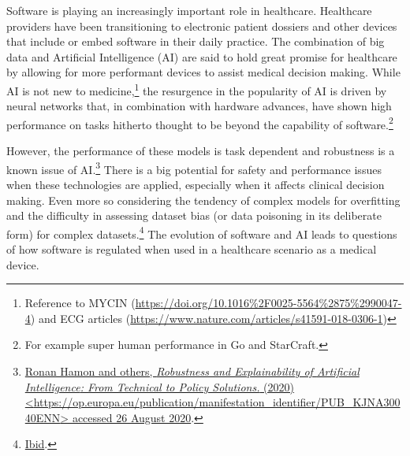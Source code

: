 \documentclass[
]{scrartcl}
\begin{document}
Software is playing an increasingly important role in healthcare. Healthcare providers have been transitioning to electronic patient dossiers and other devices that include or embed software in their daily practice. The combination of big data and Artificial Intelligence (AI) are said to hold great promise for healthcare by allowing for more performant devices to assist medical decision making. While AI is not new to medicine,\footnote{Reference to MYCIN (\url{https://doi.org/10.1016\%2F0025-5564\%2875\%2990047-4}) and ECG articles (\url{https://www.nature.com/articles/s41591-018-0306-1})} the resurgence in the popularity of AI is driven by neural networks that, in combination with hardware advances, have shown high performance on tasks hitherto thought to be beyond the capability of software.\footnote{For example super human performance in Go and StarCraft.\footnotemark{}}

However, the performance of these models is task dependent and robustness is a known issue of AI.\footnote{\protect\hyperlink{ref-hamonRobustnessExplainabilityArtificial2020}{Ronan Hamon and others, \emph{Robustness and Explainability of {Artificial Intelligence}: From Technical to Policy Solutions.} (2020) \textless{}\url{https://op.europa.eu/publication/manifestation_identifier/PUB_KJNA30040ENN}\textgreater{} accessed 26 August 2020}.} There is a big potential for safety and performance issues when these technologies are applied, especially when it affects clinical decision making. Even more so considering the tendency of complex models for overfitting and the difficulty in assessing dataset bias (or data poisoning in its deliberate form) for complex datasets.\footnote{\protect\hyperlink{ref-hamonRobustnessExplainabilityArtificial2020}{Ibid}.} The evolution of software and AI leads to questions of how software is regulated when used in a healthcare scenario as a medical device.
\end{document}
